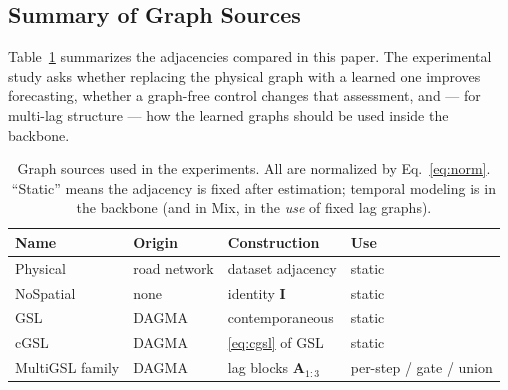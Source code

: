 \subsection{Summary of Graph Sources}\label{sec:method-summary}

Table~\ref{tab:method-graphs} summarizes the adjacencies compared in this
paper. The experimental study asks whether replacing the physical graph with
a learned one improves forecasting, whether a graph-free control changes
that assessment, and --- for multi-lag structure --- how the learned graphs
should be used inside the backbone.

\begin{table}[t]
\centering
\caption{Graph sources used in the experiments. All are normalized by
Eq.~\eqref{eq:norm}. ``Static'' means the adjacency is fixed after
estimation; temporal modeling is in the backbone (and in Mix, in the
\emph{use} of fixed lag graphs).}
\label{tab:method-graphs}
\small
\begin{tabular}{llll}
\toprule
Name & Origin & Construction & Use \\
\midrule
Physical & road network & dataset adjacency & static \\
NoSpatial & none & identity $\mathbf{I}$ & static \\
GSL & DAGMA & contemporaneous & static \\
cGSL & DAGMA & \eqref{eq:cgsl} of GSL & static \\
MultiGSL family & DAGMA & lag blocks $\mathbf{A}_{1:3}$ & per-step / gate / union \\
\bottomrule
\end{tabular}
\end{table}
